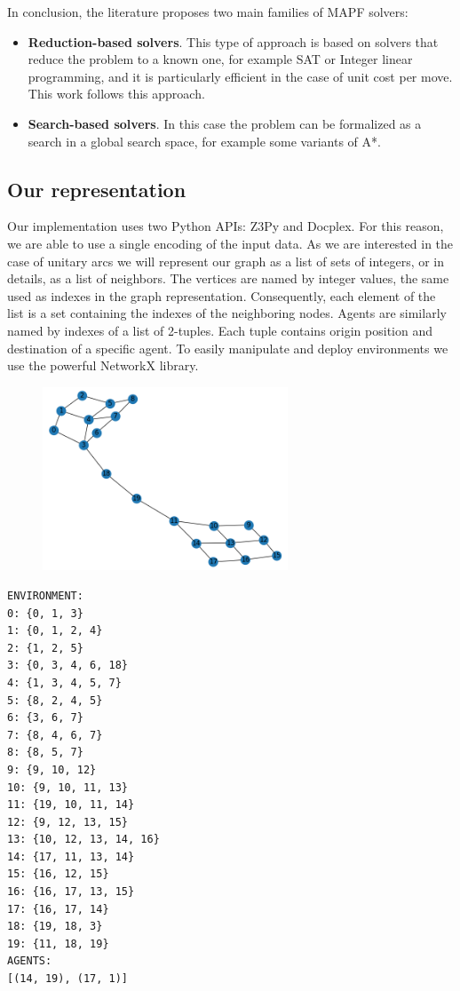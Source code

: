 \documentclass[12pt, a4paper, hidelinks]{article}
\numberwithin{equation}{section}
\begin{document}
In conclusion, the literature proposes two main families of MAPF solvers:

\begin{itemize}
\item \textbf{Reduction-based solvers}.
This type of approach is based on solvers that reduce the problem to a known one, for example SAT or Integer linear programming, and it is particularly efficient in the case of unit cost per move.
This work follows this approach.
\item \textbf{Search-based solvers}.
In this case the problem can be formalized as a search in a global search space, for example some variants of A*.
\end{itemize}

\subsection*{Our representation}
Our implementation uses two Python APIs: Z3Py and Docplex.
For this reason, we are able to use a single encoding of the input data.
As we are interested in the case of unitary arcs we will represent our graph as a list of sets of integers, or in details, as a list of neighbors.
The vertices are named by integer values, the same used as indexes in the graph representation.
Consequently, each element of the list is a set containing the indexes of the neighboring nodes.
Agents are similarly named by indexes of a list of 2-tuples.
Each tuple contains origin position and destination of a specific agent.
To easily manipulate and deploy environments we use the powerful NetworkX library.

\begin{figure}
    \centering
    \includegraphics[width=0.65\textwidth]{environment.png}
\end{figure}

\begin{lstlisting}[label={lst:environment}]
ENVIRONMENT:
0: {0, 1, 3}
1: {0, 1, 2, 4}
2: {1, 2, 5}
3: {0, 3, 4, 6, 18}
4: {1, 3, 4, 5, 7}
5: {8, 2, 4, 5}
6: {3, 6, 7}
7: {8, 4, 6, 7}
8: {8, 5, 7}
9: {9, 10, 12}
10: {9, 10, 11, 13}
11: {19, 10, 11, 14}
12: {9, 12, 13, 15}
13: {10, 12, 13, 14, 16}
14: {17, 11, 13, 14}
15: {16, 12, 15}
16: {16, 17, 13, 15}
17: {16, 17, 14}
18: {19, 18, 3}
19: {11, 18, 19}
AGENTS:
[(14, 19), (17, 1)]
\end{lstlisting}
\end{document}
